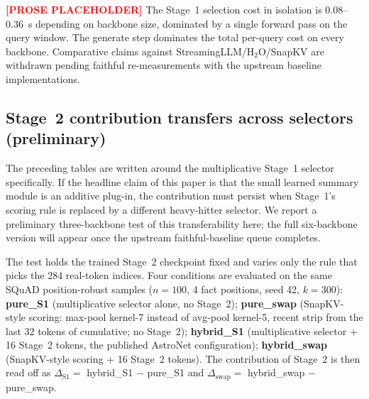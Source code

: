 \textcolor{red}{\textbf{[PROSE PLACEHOLDER]}} The Stage~1 selection cost
in isolation is $0.08$--$0.36$~s depending on backbone size, dominated
by a single forward pass on the query window. The generate step
dominates the total per-query cost on every backbone. Comparative
claims against StreamingLLM/H$_2$O/SnapKV are withdrawn pending
faithful re-measurements with the upstream baseline implementations.


\subsection{Stage~2 contribution transfers across selectors (preliminary)}\label{sec:e3}

The preceding tables are written around the multiplicative Stage~1 selector specifically. If the headline claim of this paper is that the small learned summary module is an additive plug-in, the contribution must persist when Stage~1's scoring rule is replaced by a different heavy-hitter selector. We report a preliminary three-backbone test of this transferability here; the full six-backbone version will appear once the upstream faithful-baseline queue completes.

The test holds the trained Stage~2 checkpoint fixed and varies only the rule that picks the 284 real-token indices. Four conditions are evaluated on the same SQuAD position-robust samples ($n{=}100$, 4 fact positions, seed 42, $k{=}300$):
\textbf{pure\_S1} (multiplicative selector alone, no Stage~2);
\textbf{pure\_swap} (SnapKV-style scoring: max-pool kernel-7 instead of avg-pool kernel-5, recent strip from the last 32 tokens of cumulative; no Stage~2);
\textbf{hybrid\_S1} (multiplicative selector + 16 Stage~2 tokens, the published AstroNet configuration);
\textbf{hybrid\_swap} (SnapKV-style scoring + 16 Stage~2 tokens). The contribution of Stage~2 is then read off as $\Delta_{\text{S1}} = $ hybrid\_S1 $-$ pure\_S1 and $\Delta_{\text{swap}} = $ hybrid\_swap $-$ pure\_swap.

